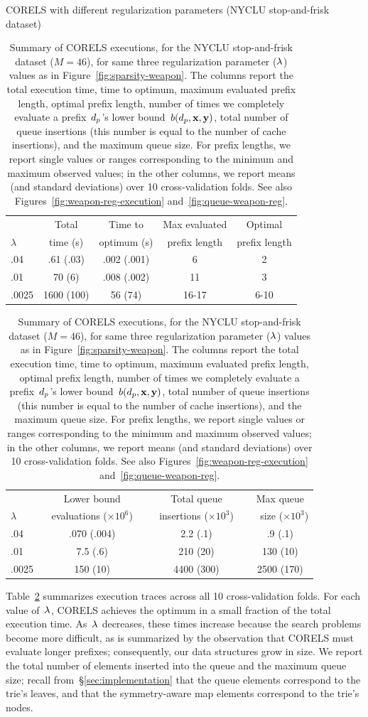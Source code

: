 \begin{table}[t!]
\centering
CORELS with different regularization parameters (NYCLU stop-and-frisk dataset) \\
\vspace{2mm}
\begin{tabular}{l | c | c | c | c}
& Total & Time to & Max evaluated & Optimal \\
$\lambda$ & time (s) & optimum (s) & prefix length & prefix length \\
\hline
.04 & .61 (.03) & .002 (.001) & 6 & 2 \\
.01 & 70 (6) & .008 (.002) & 11 & 3 \\
.0025 & 1600 (100) & 56 (74) & 16-17 & 6-10 \\
\hline
\end{tabular}
\begin{tabular}{l | c | c | c}
\hline
& Lower bound & Total queue &  Max queue \\
$\lambda$ &~ evaluations ($\times 10^6$) ~&~ insertions ($\times 10^3$) ~&~ size ($\times 10^3$) \\
\hline
.04 & .070 (.004) & 2.2 (.1) & .9 (.1) \\
.01 & 7.5 (.6) & 210 (20) & 130 (10) \\
.0025 & 150 (10) & 4400 (300) & 2500 (170) \\
\end{tabular}
\caption{Summary of CORELS executions, for the NYCLU stop-and-frisk dataset (${M = 46}$),
for same three regularization parameter (${\lambda}$) values as in Figure~\ref{fig:sparsity-weapon}.
%
The columns report the total execution time,
time to optimum, maximum evaluated prefix length, optimal prefix length,
number of times we completely evaluate a prefix~$d_p$'s lower bound~$b(d_p, \mathbf{x}, \mathbf{y})$,
total number of queue insertions (this number is equal to the number of cache insertions),
and the maximum queue size.
%
For prefix lengths, we report single values or ranges corresponding to the minimum and maximum observed values;
in the other columns, we report means (and standard deviations) over 10 cross-validation folds.
%
See also Figures~\ref{fig:weapon-reg-execution} and~\ref{fig:queue-weapon-reg}.
}
\vspace{4mm}
\label{tab:weapon-reg}
\end{table}

Table~\ref{tab:weapon-reg} summarizes execution traces across all 10 cross-validation folds.
%
For each value of~${\lambda}$, CORELS achieves the optimum in a small fraction of the total execution time.
%
As~${\lambda}$ decreases, these times increase because the search problems become more difficult,
as is summarized by the observation that CORELS must evaluate longer prefixes;
consequently, our data structures grow in size.
%
We report the total number of elements inserted into the queue and the maximum queue size;
recall from~\S\ref{sec:implementation} that the queue elements correspond to the trie's leaves,
and that the symmetry-aware map elements correspond to the trie's nodes.


